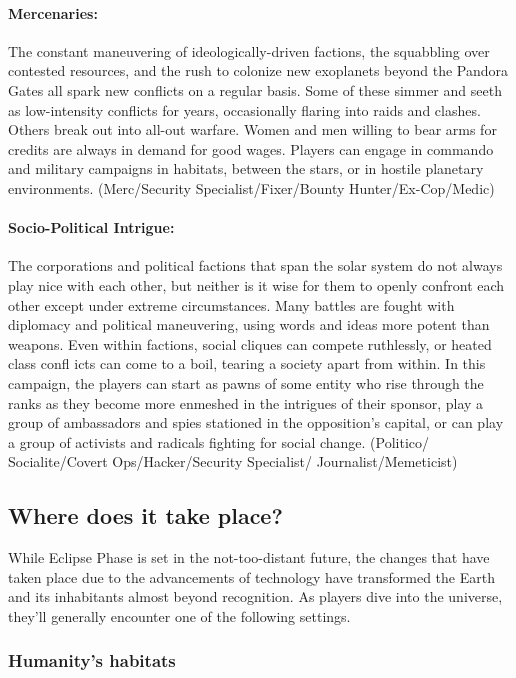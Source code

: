 \paragraph{Mercenaries:} The constant maneuvering of ideologically-driven factions, the squabbling over contested resources, and the rush to colonize new exoplanets beyond the Pandora Gates all spark new conflicts on a regular basis. Some of these simmer and seeth as low-intensity conflicts for years, occasionally flaring into raids and clashes. Others break out into all-out warfare. Women and men willing to bear arms for credits are always in demand for good wages. Players can engage in commando and military campaigns in habitats, between the stars, or in hostile planetary environments. (Merc/Security Specialist/Fixer/Bounty Hunter/Ex-Cop/Medic)

\paragraph{Socio-Political Intrigue:} The corporations and political factions that span the solar system do not always play nice with each other, but neither is it wise for them to openly confront each other except under extreme circumstances. Many battles are fought with diplomacy and political maneuvering, using words and ideas more potent than weapons. Even within factions, social cliques can compete ruthlessly, or heated class confl icts can come to a boil, tearing a society apart from within. In this campaign, the players can start as pawns of some entity who rise through the ranks as they become more enmeshed in the intrigues of their sponsor, play a group of ambassadors and spies stationed in the opposition's capital, or can play a group of activists and radicals fighting for social change. (Politico/ Socialite/Covert Ops/Hacker/Security Specialist/ Journalist/Memeticist)


\subsection{Where does it take place?}
\label{sec:where-does-it}

While Eclipse Phase is set in the not-too-distant future, the changes that have taken place due to the advancements of technology have transformed the Earth and its inhabitants almost beyond recognition. As players dive into the universe, they'll generally encounter one of the following settings.


\subsubsection{Humanity's habitats}
\label{sec:humanitys-habitats}

